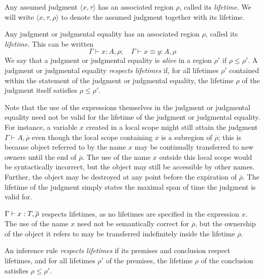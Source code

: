 \documentclass[11pt]{book}
\newcommand{\lstatic}{\ensuremath{\overline\rho}}
\begin{document}
\begin{defn}
  Any assumed judgment \( \langle x, \tau \rangle \) has an associated region \( \rho \), called its \textit{lifetime}.
  We will write \( \langle x, \tau, \rho \rangle \) to denote the assumed judgment together with its lifetime.
\end{defn}
\begin{defn}
  Any judgment or judgmental equality has an associated region \( \rho \), called its \textit{lifetime}.
  This can be written
  \[ \Gamma \vdash x : A, \rho;\quad \Gamma \vdash x \equiv y : A, \rho \]
  We say that a judgment or judgmental equality is \textit{alive} in a region \( \rho' \) if \( \rho \leq \rho' \).
  A judgment or judgmental equality \textit{respects lifetimes} if, for all lifetimes \( \rho' \) contained within the statement of the judgment or judgmental equality, the lifetime \( \rho \) of the judgment itself satisfies \( \rho \leq \rho' \).

  Note that the use of the expressions themselves in the judgment or judgmental equality need not be valid for the lifetime of the judgment or judgmental equality.
  For instance, a variable \( x \) created in a local scope might still attain the judgment \( \Gamma \vdash A,\lstatic \) even though the local scope containing \( x \) is a subregion of \( \lstatic \); this is because object referred to by the name \( x \) may be continually transferred to new owners until the end of \( \lstatic \).
  The use of the name \( x \) outside this local scope would be syntactically incorrect, but the object may still be accessible by other names.
  Further, the object may be destroyed at any point before the expiration of \( \lstatic \).
  The lifetime of the judgment simply states the maximal span of time the judgment is valid for.
\end{defn}
\begin{eg}
  \( \oftp\Gamma x{T,\lstatic} \) respects lifetimes, as no lifetimes are specified in the expression \( x \).
  The use of the name \( x \) need not be semantically correct for \( \lstatic \), but the ownership of the object it refers to may be transferred indefinitely inside the lifetime \( \lstatic \).
\end{eg}
\begin{defn}
  An inference rule \textit{respects lifetimes} if its premises and conclusion respect lifetimes, and for all lifetimes \( \rho' \) of the premises, the lifetime \( \rho \) of the conclusion satisfies \( \rho \leq \rho' \).
\end{defn}
\end{document}
